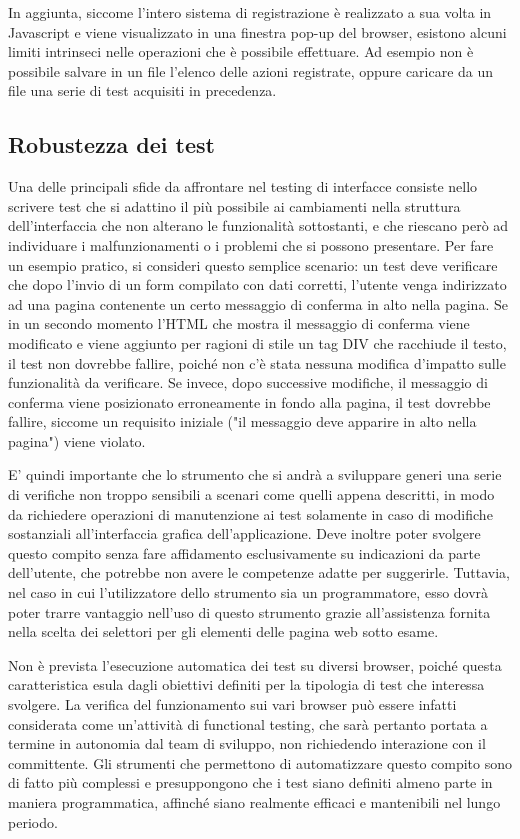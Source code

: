 In aggiunta, siccome l'intero sistema di registrazione è realizzato a sua volta in Javascript e viene visualizzato in una finestra pop-up del browser, esistono alcuni limiti intrinseci nelle operazioni che è possibile effettuare. Ad esempio non è possibile salvare in un file l'elenco delle azioni registrate, oppure caricare da un file una serie di test acquisiti in precedenza.

\subsection{Robustezza dei test}

Una delle principali sfide da affrontare nel testing di interfacce consiste nello scrivere test che si adattino il più possibile ai cambiamenti nella struttura dell'interfaccia che non alterano le funzionalità sottostanti, e che riescano però ad individuare i malfunzionamenti o i problemi che si possono presentare. Per fare un esempio pratico, si consideri questo semplice scenario: un test deve verificare che dopo l'invio di un form compilato con dati corretti, l'utente venga indirizzato ad una pagina contenente un certo messaggio di conferma in alto nella pagina. Se in un secondo momento l'HTML che mostra il messaggio di conferma viene modificato e viene aggiunto per ragioni di stile un tag DIV che racchiude il testo, il test non dovrebbe fallire, poiché non c'è stata nessuna modifica d'impatto sulle funzionalità da verificare. Se invece, dopo successive modifiche, il messaggio di conferma viene posizionato erroneamente in fondo alla pagina, il test dovrebbe fallire, siccome un requisito iniziale ("il messaggio deve apparire in alto nella pagina") viene violato.

E' quindi importante che lo strumento che si andrà a sviluppare generi una serie di verifiche non troppo sensibili a scenari come quelli appena descritti, in modo da richiedere operazioni di manutenzione ai test solamente in caso di modifiche sostanziali all'interfaccia grafica dell'applicazione. Deve inoltre poter svolgere questo compito senza fare affidamento esclusivamente su indicazioni da parte dell'utente, che potrebbe non avere le competenze adatte per suggerirle. Tuttavia, nel caso in cui l'utilizzatore dello strumento sia un programmatore, esso dovrà poter trarre vantaggio nell'uso di questo strumento grazie all'assistenza fornita nella scelta dei selettori per gli elementi delle pagina web sotto esame.

Non è prevista l'esecuzione automatica dei test su diversi browser, poiché questa caratteristica esula dagli obiettivi definiti per la tipologia di test che interessa svolgere. La verifica del funzionamento sui vari browser può essere infatti considerata come un'attività di functional testing, che sarà pertanto portata a termine in autonomia dal team di sviluppo, non richiedendo interazione con il committente. Gli strumenti che permettono di automatizzare questo compito sono di fatto più complessi e presuppongono che i test siano definiti almeno parte in maniera programmatica, affinché siano realmente efficaci e mantenibili nel lungo periodo.

